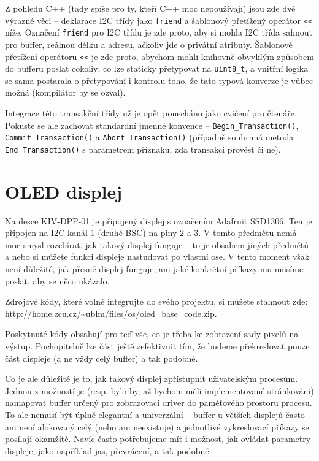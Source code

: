 \documentclass{article}
\begin{document}
Z pohledu C++ (tady spíše pro ty, kteří C++ moc nepoužívají) jsou zde dvě výrazné věci -- deklarace I2C třídy jako \texttt{friend} a šablonový přetížený operátor \texttt{<<} níže. Označení \texttt{friend} pro I2C třídu je zde proto, aby si mohla I2C třída sahnout pro buffer, reálnou délku a adresu, ačkoliv jde o privátní atributy. Šablonové přetížení operátoru \texttt{<<} je zde proto, abychom mohli knihovně-obvyklým způsobem do bufferu poslat cokoliv, co lze staticky přetypovat na \texttt{uint8\_t}, a vnitřní logika se sama postarala o přetypování i kontrolu toho, že tato typová konverze je vůbec možná (kompilátor by se ozval).

Integrace této transakční třídy už je opět ponecháno jako cvičení pro čtenáře. Pokuste se ale zachovat standardní jmenné konvence -- \texttt{Begin\_Transaction()}, \texttt{Commit\_Transaction()} a \texttt{Abort\_Transaction()} (případně souhrnná metoda \texttt{End\_Transaction()} s parametrem příznaku, zda transakci provést či ne).

\section{OLED displej}

Na desce KIV-DPP-01 je připojený displej s označením Adafruit SSD1306. Ten je připojen na I2C kanál 1 (druhé BSC) na piny 2 a 3. V tomto předmětu nemá moc smysl rozebírat, jak takový displej funguje -- to je obsahem jiných předmětů a nebo si můžete funkci displeje nastudovat po vlastní ose. V tento moment však není důležité, jak přesně displej funguje, ani jaké konkrétní příkazy mu musíme poslat, aby se něco ukázalo.

Zdrojové kódy, které volně integrujte do svého projektu, si můžete stahnout zde: \url{http://home.zcu.cz/~ublm/files/os/oled_base_code.zip}.

Poskytnuté kódy obsahují pro teď vše, co je třeba ke zobrazení sady pixelů na výstup. Pochopitelně lze část ještě zefektivnit tím, že budeme překreslovat pouze část displeje (a ne vždy celý buffer) a tak podobně.

Co je ale důležité je to, jak takový displej zpřístupnit uživatelským procesům. Jednou z možností je (resp. bylo by, až bychom měli implementované stránkování) namapovat buffer určený pro zobrazovací driver do paměťového prostoru procesu. To ale nemusí být úplně elegantní a univerzální -- buffer u větších displejů často ani není alokovaný celý (nebo ani neexistuje) a jednotlivé vykreslovací příkazy se posílají okamžitě. Navíc často potřebujeme mít i možnost, jak ovládat parametry displeje, jako například jas, převrácení, a tak podobně.
\end{document}
